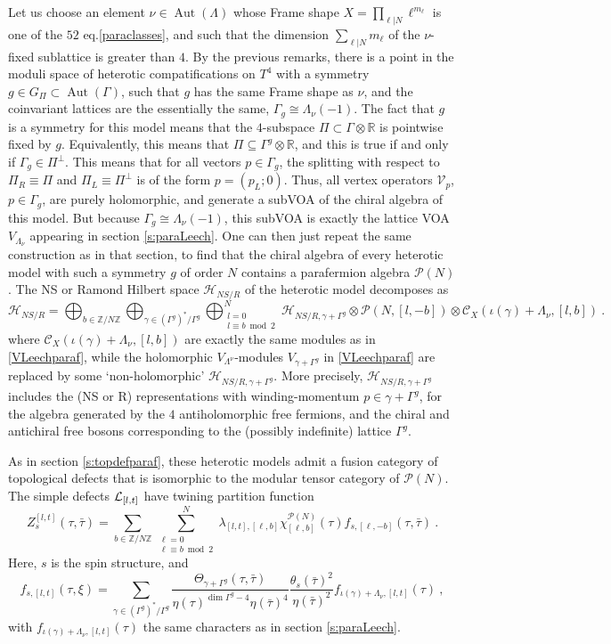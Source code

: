 \documentclass[11pt,reqno]{article}
\newcommand{\be}{\begin{equation}}
\newcommand{\ee}{\end{equation}}
\newcommand{\CH}{\mathcal{H}}
\newcommand{\CL}{{\cal L}}
\newcommand{\calC}{\mathcal{C}}
\DeclareMathOperator{\Aut}{Aut}
\newcommand{\ZZ}{\mathbb{Z}}
\newcommand{\RR}{\mathbb{R}}
\newcommand{\paraf}{\mathcal{P}}
\begin{document}
Let us choose an element $\nu\in \Aut(\Lambda)$ whose Frame shape $X=\prod_{\ell|N}  \ell^{m_\ell}$ is one of the $52$ eq.\eqref{paraclasses}, and such that the dimension $\sum_{\ell|N} m_\ell$ of the $\nu$-fixed sublattice is greater than $4$. By the previous remarks, there is a point in the moduli space of heterotic compatifications on $T^4$ with a symmetry $g\in G_\Pi\subset \Aut(\Gamma)$, such that $g$ has the same Frame shape as $\nu$, and the coinvariant lattices are the essentially the same, $\Gamma_g\cong \Lambda_\nu(-1)$. The fact that $g$ is a symmetry for this model means that the $4$-subspace $\Pi\subset \Gamma\otimes \RR$ is pointwise fixed by $g$. Equivalently, this means that $\Pi\subseteq \Gamma^g\otimes \RR$, and this is true if and only if $\Gamma_g\in \Pi^\perp$. This means that for all vectors $p\in \Gamma_g$, the splitting with respect to $\Pi_R\equiv\Pi$ and $\Pi_L\equiv \Pi^\perp$ is of the form $p=(p_L;0)$. Thus, all vertex operators $\mathcal{V}_p$, $p\in \Gamma_g$, are purely holomorphic, and generate a subVOA of the chiral algebra of this model. But because $\Gamma_g\cong \Lambda_\nu(-1)$, this subVOA is exactly the lattice VOA $V_{\Lambda_\nu}$ appearing in section \ref{s:paraLeech}. One can then just repeat the same construction as in that section, to find that the chiral algebra of every heterotic model with such a symmetry $g$ of order $N$ contains a parafermion algebra $\paraf(N)$. The NS or Ramond Hilbert space $\CH_{NS/R}$ of the heterotic model decomposes as
\be \CH_{NS/R}=\bigoplus_{b\in \ZZ/N\ZZ} \bigoplus_{\gamma\in (\Gamma^g)^*/\Gamma^g}\bigoplus_{\substack{l=0\\l\equiv b\bmod{2}}}^N\CH_{NS/R,\gamma+ \Gamma^g}\otimes \paraf(N,[l,-b])\otimes  \calC_X(\iota(\gamma)+\Lambda_\nu,[l,b]) \ .
\ee 
where $\calC_X(\iota(\gamma)+\Lambda_\nu,[l,b]) $ are exactly the same modules as in \eqref{VLeechparaf}, while the holomorphic $V_{\Lambda^\nu}$-modules $V_{\gamma+ \Gamma^g}$ in \eqref{VLeechparaf} are replaced by some `non-holomorphic' $\CH_{NS/R,\gamma+ \Gamma^g}$. More precisely, $\CH_{NS/R,\gamma+ \Gamma^g}$ includes the (NS or R) representations with winding-momentum $p\in \gamma+ \Gamma^g$, for the algebra generated by the $4$ antiholomorphic free fermions, and the chiral and antichiral free bosons corresponding to the (possibly indefinite) lattice $\Gamma^g$.

As in section \ref{s:topdefparaf}, these heterotic models admit a fusion category of topological defects that is isomorphic to the modular tensor category of $\paraf(N)$. The simple defects $\CL_{[l,t]}$ have twining partition function
\be Z^{[l,t]}_s(\tau,\bar\tau)=\sum_{b\in \ZZ/N\ZZ} \sum_{\substack{\ell=0\\\ell\equiv b\bmod{2}}}^N \lambda_{[l,t],[\ell ,b]}\chi^{\paraf(N)}_{[\ell ,b]}(\tau)f_{s,[\ell,-b]}(\tau,\bar\tau)\ .
\ee Here, $s$ is the spin structure, and
\be f_{s,[l,t]}(\tau,\xi )=\sum_{\gamma\in (\Gamma^g)^*/\Gamma^g}\frac{\Theta_{\gamma+\Gamma^g}(\tau,\bar\tau)}{\eta(\tau)^{\dim \Gamma^g-4}\eta(\bar\tau)^{4}}\frac{\theta_s(\bar\tau)^2}{\eta(\bar\tau)^2}f_{\iota(\gamma)+\Lambda_\nu,[l,t]}(\tau)\ , 
\ee with $f_{\iota(\gamma)+\Lambda_\nu,[l,t]}(\tau)$ the same characters as in section \ref{s:paraLeech}.
\end{document}

